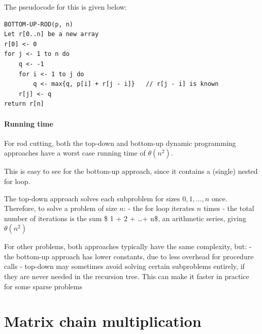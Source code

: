 \documentclass[11pt]{article}
\begin{document}
The pseudocode for this is given below:

\begin{verbatim}
BOTTOM-UP-ROD(p, n)
Let r[0..n] be a new array
r[0] <- 0
for j <- 1 to n do
    q <- -1
    for i <- 1 to j do
        q <- max{q, p[i] + r[j - i]}   // r[j - i] is known
    r[j] <- q
return r[n]
\end{verbatim}

    \paragraph{Running time}\label{running-time}

For rod cutting, both the top-down and bottom-up dynamic programming
approaches have a worst case running time of \(\theta(n^2)\).

This is easy to see for the bottom-up approach, since it contains a
(single) nested for loop.

The top-down approach solves each subproblem for sizes
\(0, 1, \ldots, n\) once. Therefore, to solve a problem of size \(n\): -
the for loop iterates \(n\) times - the total number of iterations is
the sum \$ 1 + 2 + \ldots + n\$, an arithmetic series, giving
\(\theta(n^2)\)

For other problems, both approaches typically have the same complexity,
but: - the bottom-up approach has lower constants, due to less overhead
for procedure calls - top-down may sometimes avoid solving certain
subproblems entirely, if they are never needed in the recursion tree.
This can make it faster in practice for some sparse problems

    \section{Matrix chain multiplication}\label{matrix-chain-multiplication}
\end{document}
